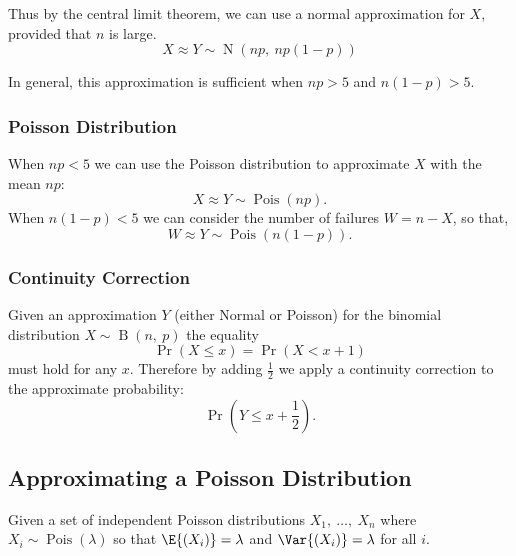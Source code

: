\documentclass{article}
\begin{document}
\begin{multicols}{3}
    Thus by the central limit theorem, we can use a normal approximation for \(X\), provided that \(n\) is large.
    \begin{equation*}
        X \approx Y \sim \operatorname{N}{\left( np,\: np\left( 1 - p \right) \right)}
    \end{equation*}

    In general, this approximation is sufficient when \(np > 5\) and \(n\left( 1 - p \right) > 5\).
    \subsubsection{Poisson Distribution}
    When \(np < 5\) we can use the Poisson distribution to approximate \(X\) with the mean \(np\):
    \begin{equation*}
        X \approx Y \sim \operatorname{Pois}{\left( np \right)}.
    \end{equation*}
    When \(n\left( 1 - p \right) < 5\) we can consider the number of failures \(W = n - X\), so that,
    \begin{equation*}
        W \approx Y \sim \operatorname{Pois}{\left( n\left( 1 - p \right) \right)}.
    \end{equation*}
    \subsubsection{Continuity Correction}
    Given an approximation \(Y\) (either Normal or Poisson) for the binomial distribution \(X \sim \operatorname{B}{\left( n,\: p \right)}\) the equality
    \begin{equation*}
        \Pr{\left( X \leq x \right)} = \Pr{\left( X < x + 1 \right)}
    \end{equation*}
    must hold for any \(x\). Therefore by adding \(\frac{1}{2}\) we apply a continuity correction to the approximate probability:
    \begin{equation*}
        \Pr{\left( Y \leq x + \frac{1}{2} \right)}.
    \end{equation*}
    \subsection{Approximating a Poisson Distribution}
    Given a set of independent Poisson distributions \(X_1,\: \ldots ,\: X_n\) where \(X_i \sim \operatorname{Pois}{\left( \lambda \right)}\)
    so that \(\E{\left( X_i \right)} = \lambda\) and \(\Var{\left( X_i \right)} = \lambda\) for all \(i\).


\end{multicols}
\end{document}
